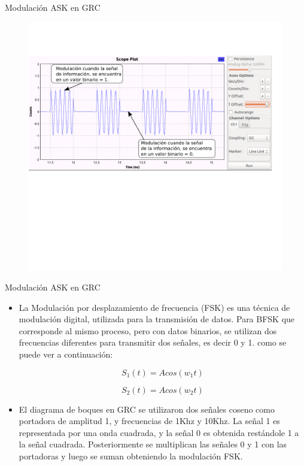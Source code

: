 \begin{frame}{Modulación ASK en GRC}
\vspace{-1.5cm}
\begin{figure}[H]
\centering
\includegraphics[width=1.1\textwidth]{parte1/lab4/pdf/lab4_3.pdf}
\end{figure}
\end{frame}

\begin{frame}{Modulación ASK en GRC}

  \begin{itemize}
  \item {
La Modulación por desplazamiento de frecuencia (FSK) es una técnica de modulación digital, utilizada para la transmisión de datos. Para BFSK que corresponde al mismo proceso, pero con datos binarios, se utilizan dos frecuencias diferentes para transmitir dos señales, es decir 0 y 1. como se puede ver a continuación:

\begin{equation*}
S_{1}(t) = Acos(w_{1}t)
\end{equation*}

\begin{equation*}
S_{2}(t) = Acos(w_{2}t)
\end{equation*}

  }
  \item {
El diagrama de boques en GRC se utilizaron dos señales coseno como portadora de amplitud 1, y frecuencias de 1Khz y 10Khz. La señal 1 es representada por una onda cuadrada, y la señal 0 es obtenida restándole 1 a la señal cuadrada. Posteriormente se multiplican las señales 0 y 1 con las portadoras y luego se suman obteniendo la modulación FSK.
  }
  \end{itemize}
\end{frame}


